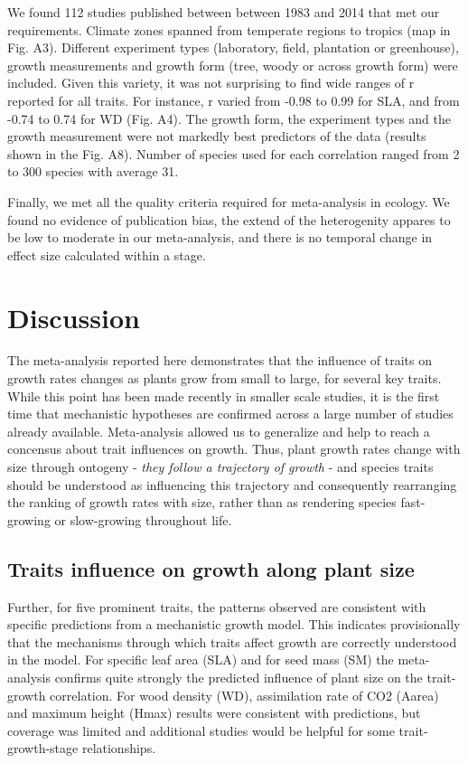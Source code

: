 \documentclass[a4paper]{article}\usepackage[]{graphicx}\usepackage[]{color}
\begin{document}
We found 112 studies published between between 1983 and 2014 that met our requirements. Climate zones spanned from temperate regions to  tropics (map in Fig. A3). Different experiment types (laboratory, field, plantation or greenhouse), growth measurements and growth form (tree, woody or across growth form) were included. Given this variety, it was not surprising to find wide ranges of r reported for all traits. For instance, r varied from -0.98 to 0.99 for SLA, and from -0.74 to 0.74 for WD (Fig. A4). The growth form, the experiment types and the growth measurement were not markedly best predictors of the data (results shown in the Fig. A8). Number of species used for each correlation ranged from 2 to 300 species with average 31. 

Finally, we met all the quality criteria required for meta-analysis in ecology. We found no evidence of publication bias, the extend of the heterogenity appares to be low to moderate in our meta-analysis, and there is no temporal change in effect size calculated within a stage.


\section*{Discussion}\label{discussion}

The meta-analysis reported here demonstrates that the influence of traits on growth rates changes as plants grow from small to large, for several key traits. While this point has been made recently in smaller scale studies, it is the first time that mechanistic hypotheses are confirmed across a large number of studies already available. Meta-analysis allowed us to generalize and help to reach a concensus about trait influences on growth. Thus, plant growth rates change with size through ontogeny \citep{Condit:1993hd, Clark:1999ed, Herault:2011dd} - \textit{they follow a trajectory of growth} - and species traits should be understood as influencing this trajectory and consequently rearranging the ranking of growth rates with size, rather than as rendering species fast-growing or slow-growing throughout life. 

\subsection*{Traits influence on growth along plant size}

Further, for five prominent traits, the patterns observed are consistent with specific predictions from a mechanistic growth model. This indicates provisionally that the mechanisms through which traits affect growth are correctly understood in the model. For specific leaf area (SLA) and for seed mass (SM) the meta-analysis confirms quite strongly the predicted influence of plant size on the trait-growth correlation. For wood density (WD), assimilation rate of CO2 (Aarea) and maximum height (Hmax) results were consistent with predictions, but coverage was limited and additional studies would be helpful for some trait-growth-stage relationships. 
\end{document}
